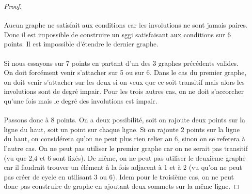 \begin{proof}
\begin{center}
  \end{center}

  \paragraph{}
  Aucun graphe ne satisfait aux conditions car les involutions ne sont jamais paires. Donc il est impossible de construire un sggi satisfaisant aux conditions sur 6 points. Il est impossible d'étendre le dernier graphe.

  \paragraph{}
  Si nous essayons sur 7 points en partant d'un des 3 graphes précédents valides. On doit forcément venir s'attacher sur 5 ou sur 6. Dans le cas du premier graphe, on doit venir s'attacher sur les deux si on veux que ce soit transitif mais alors les involutions sont de degré impair. Pour les trois autres cas, on ne doit s'accorcher qu'une fois mais le degré des involutions est impair.

  \paragraph{}
  Passons donc à 8 points. On a deux possibilité, soit on rajoute deux points sur la ligne du haut, soit un point sur chaque ligne. Si on rajoute 2 points sur la ligne du haut, on considérera qu'on ne peut plus rien relier au 6, sinon on se referera à l'autre cas. On ne peut pas utiliser le premier graphe car on ne serait pas transitif (vu que 2,4 et 6 sont fixés). De même, on ne peut pas utiliser le deuxième graphe car il faudrait trouver un élément à la fois adjacent à 1 et à 2 (vu qu'on ne peut pas créer de cycle en utilisant 3 ou 6). Idem pour le troisième cas, on ne peut donc pas construire de graphe en ajoutant deux sommets sur la même ligne.


\end{proof}
